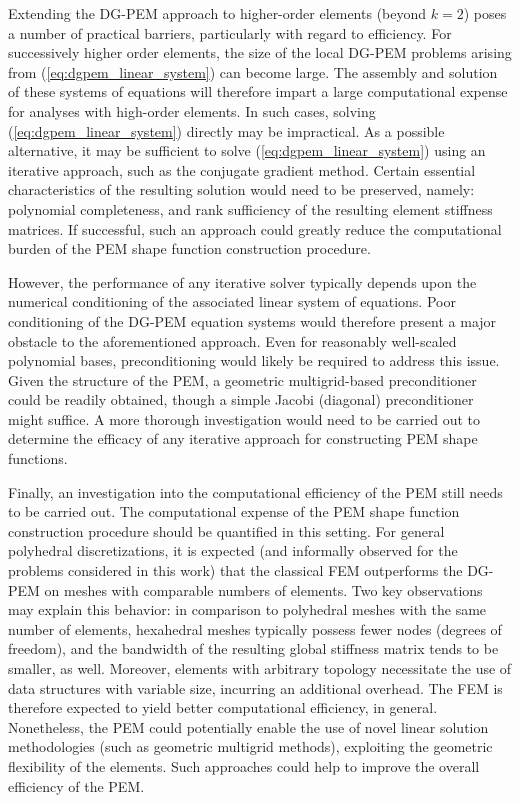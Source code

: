 Extending the DG-PEM approach to higher-order elements (beyond $k=2$) poses a number of practical barriers, particularly with regard to efficiency. For successively higher order elements, the size of the local DG-PEM problems arising from (\ref{eq:dgpem_linear_system}) can become large. The assembly and solution of these systems of equations will therefore impart a large computational expense for analyses with high-order elements. In such cases, solving (\ref{eq:dgpem_linear_system}) directly may be impractical. As a possible alternative, it may be sufficient to solve (\ref{eq:dgpem_linear_system}) using an iterative approach, such as the conjugate gradient method. Certain essential characteristics of the resulting solution would need to be preserved, namely: polynomial completeness, and rank sufficiency of the resulting element stiffness matrices. If successful, such an approach could greatly reduce the computational burden of the PEM shape function construction procedure.

However, the performance of any iterative solver typically depends upon the numerical conditioning of the associated linear system of equations. Poor conditioning of the DG-PEM equation systems would therefore present a major obstacle to the aforementioned approach. Even for reasonably well-scaled polynomial bases, preconditioning would likely be required to address this issue. Given the structure of the PEM, a geometric multigrid-based preconditioner could be readily obtained, though a simple Jacobi (diagonal) preconditioner might suffice. A more thorough investigation would need to be carried out to determine the efficacy of any iterative approach for constructing PEM shape functions.

Finally, an investigation into the computational efficiency of the PEM still needs to be carried out. The computational expense of the PEM shape function construction procedure should be quantified in this setting. For general polyhedral discretizations, it is expected (and informally observed for the problems considered in this work) that the classical FEM outperforms the DG-PEM on meshes with comparable numbers of elements. Two key observations may explain this behavior: in comparison to polyhedral meshes with the same number of elements, hexahedral meshes typically possess fewer nodes (degrees of freedom), and the bandwidth of the resulting global stiffness matrix tends to be smaller, as well. Moreover, elements with arbitrary topology necessitate the use of data structures with variable size, incurring an additional overhead. The FEM is therefore expected to yield better computational efficiency, in general. Nonetheless, the PEM could potentially enable the use of novel linear solution methodologies (such as geometric multigrid methods), exploiting the geometric flexibility of the elements. Such approaches could help to improve the overall efficiency of the PEM.